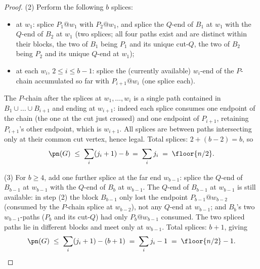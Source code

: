 \begin{proof}
(2) Perform the following $b$ splices:
\begin{itemize}[leftmargin=1.5em]
\item at $w_1$: splice $P_1@w_1$ with $P_2@w_1$, and splice the $Q$-end of $B_1$ at $w_1$ with
the $Q$-end of $B_2$ at $w_1$ (two splices; all four paths exist and are distinct within their
blocks, the two of $B_1$ being $P_1$ and its unique cut-$Q$, the two of $B_2$ being $P_2$ and
its unique $Q$-end at $w_1$);
\item at each $w_i$, $2\le i\le b-1$: splice the (currently available) $w_i$-end of the
$P$-chain accumulated so far with $P_{i+1}@w_i$ (one splice each).
\end{itemize}
The $P$-chain after the splices at $w_1,\dots,w_i$ is a single path contained in
$B_1\cup\dots\cup B_{i+1}$ and ending at $w_{i+1}$: indeed each splice consumes one endpoint of
the chain (the one at the cut just crossed) and one endpoint of $P_{i+1}$, retaining
$P_{i+1}$'s other endpoint, which is $w_{i+1}$. All splices are between paths intersecting
only at their common cut vertex, hence legal. Total splices: $2+(b-2)=b$, so
\[
\pn(G)\;\le\;\sum_i(j_i+1)-b\;=\;\sum_ij_i\;=\;\floor{n/2}.
\]

(3) For $b\ge4$, add one further splice at the far end $w_{b-1}$: splice the $Q$-end of
$B_{b-1}$ at $w_{b-1}$ with the $Q$-end of $B_b$ at $w_{b-1}$. The $Q$-end of $B_{b-1}$ at
$w_{b-1}$ is still available: in step (2) the block $B_{b-1}$ only lost the endpoint
$P_{b-1}@w_{b-2}$ (consumed by the $P$-chain splice at $w_{b-2}$), not any $Q$-end at
$w_{b-1}$; and $B_b$'s two $w_{b-1}$-paths ($P_b$ and its cut-$Q$) had only $P_b@w_{b-1}$
consumed. The two spliced paths lie in different blocks and meet only at $w_{b-1}$. Total
splices: $b+1$, giving
\[
\pn(G)\;\le\;\sum_i(j_i+1)-(b+1)\;=\;\sum_ij_i-1\;=\;\floor{n/2}-1. \qedhere
\]
\end{proof}

